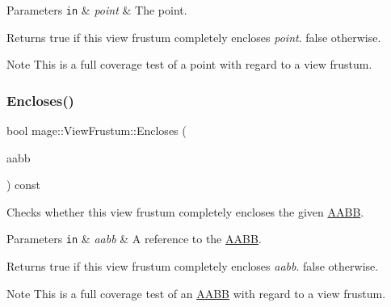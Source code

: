 \begin{DoxyParams}[1]{Parameters}
\mbox{\tt in}  & {\em point} & The point. \\
\hline
\end{DoxyParams}
\begin{DoxyReturn}{Returns}
{\ttfamily true} if this view frustum completely encloses {\itshape point}. {\ttfamily false} otherwise. 
\end{DoxyReturn}
\begin{DoxyNote}{Note}
This is a full coverage test of a point with regard to a view frustum. 
\end{DoxyNote}
\hypertarget{structmage_1_1_view_frustum_ad9bffbf0a041452888559db4a4ed5f48}{}\label{structmage_1_1_view_frustum_ad9bffbf0a041452888559db4a4ed5f48} 
\subsubsection{\texorpdfstring{Encloses()}{Encloses()}\hspace{0.1cm}{\footnotesize\ttfamily [3/4]}}
{\footnotesize\ttfamily bool mage\+::\+View\+Frustum\+::\+Encloses (\begin{DoxyParamCaption}\item[{const \hyperlink{structmage_1_1_a_a_b_b}{A\+A\+BB} \&}]{aabb }\end{DoxyParamCaption}) const\hspace{0.3cm}{\ttfamily [noexcept]}}

Checks whether this view frustum completely encloses the given \hyperlink{structmage_1_1_a_a_b_b}{A\+A\+BB}.


\begin{DoxyParams}[1]{Parameters}
\mbox{\tt in}  & {\em aabb} & A reference to the \hyperlink{structmage_1_1_a_a_b_b}{A\+A\+BB}. \\
\hline
\end{DoxyParams}
\begin{DoxyReturn}{Returns}
{\ttfamily true} if this view frustum completely encloses {\itshape aabb}. {\ttfamily false} otherwise. 
\end{DoxyReturn}
\begin{DoxyNote}{Note}
This is a full coverage test of an \hyperlink{structmage_1_1_a_a_b_b}{A\+A\+BB} with regard to a view frustum. 
\end{DoxyNote}
\hypertarget{structmage_1_1_view_frustum_a779328d61928c60bfc0290d85eb79e4c}{}\label{structmage_1_1_view_frustum_a779328d61928c60bfc0290d85eb79e4c} 
